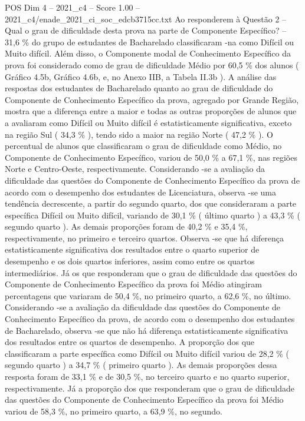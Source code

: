 \begin{textsample}{POS Dim 4 – 2021\_c4 – Score 1.00 – 2021\_c4/enade\_2021\_ci\_soc\_edcb3715cc.txt}
Ao responderem à Questão 2 – Qual o grau de dificuldade desta prova na parte de Componente Específico? – 31,6 \% do grupo de estudantes de Bacharelado classificaram -na como Difícil ou Muito difícil.
Além disso, o Componente modal de Conhecimento Específico da prova foi considerado como de grau de dificuldade Médio por 60,5 \% dos alunos ( Gráfico 4.5b, Gráfico 4.6b, e, no Anexo IIB, a Tabela II.3b ).
A análise das respostas dos estudantes de Bacharelado quanto ao grau de dificuldade do Componente de Conhecimento Específico da prova, agregado por Grande Região, mostra que a diferença entre a maior e todas as outras proporções de alunos que a avaliaram como Difícil ou Muito difícil é estatisticamente significativa, exceto na região Sul ( 34,3 \% ), tendo sido a maior na região Norte ( 47,2 \% ).
O percentual de alunos que classificaram o grau de dificuldade como Médio, no Componente de Conhecimento Específico, variou de 50,0 \% a 67,1 \%, nas regiões Norte e Centro-Oeste, respectivamente.
Considerando -se a avaliação da dificuldade das questões do Componente de Conhecimento Específico da prova de acordo com o desempenho dos estudantes de Licenciatura, observa -se uma tendência decrescente, a partir do segundo quarto, dos que consideraram a parte específica Difícil ou Muito difícil, variando de 30,1 \% ( último quarto ) a 43,3 \% ( segundo quarto ).
As demais proporções foram de 40,2 \% e 35,4 \%, respectivamente, no primeiro e terceiro quartos.
Observa -se que há diferença estatisticamente significativa dos resultados entre o quarto superior de desempenho e os dois quartos inferiores, assim como entre os quartos intermediários.
Já os que responderam que o grau de dificuldade das questões do Componente de Conhecimento Específico da prova foi Médio atingiram percentagens que variaram de 50,4 \%, no primeiro quarto, a 62,6 \%, no último.
Considerando -se a avaliação da dificuldade das questões do Componente de Conhecimento Específico da prova, de acordo com o desempenho dos estudantes de Bacharelado, observa -se que não há diferença estatisticamente significativa dos resultados entre os quartos de desempenho.
A proporção dos que classificaram a parte específica como Difícil ou Muito difícil variou de 28,2 \% ( segundo quarto ) a 34,7 \% ( primeiro quarto ).
As demais proporções dessa resposta foram de 33,1 \% e de 30,5 \%, no terceiro quarto e no quarto superior, respectivamente.
Já a proporção dos que responderam que o grau de dificuldade das questões do Componente de Conhecimento Específico da prova foi Médio variou de 58,3 \%, no primeiro quarto, a 63,9 \%, no segundo.

\end{textsample}
